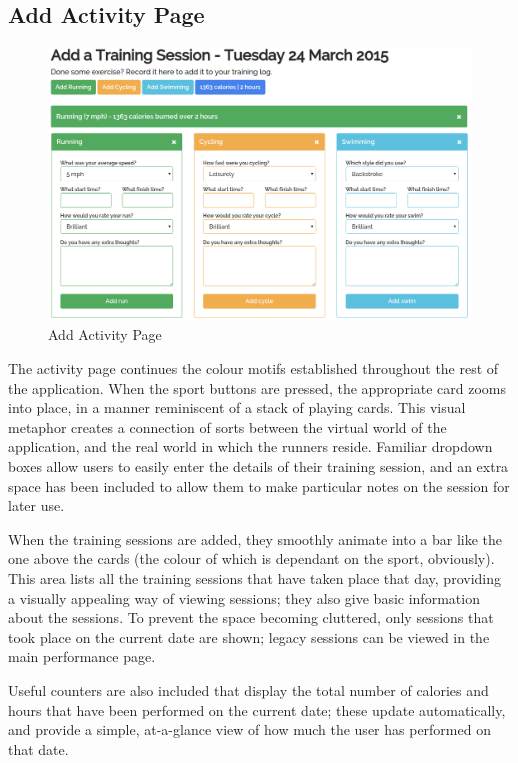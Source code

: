 \documentclass{article}[12pt,a4paper]
\begin{document}
\subsection{Add Activity Page}
\begin{figure}[h!]
  \includegraphics[scale=0.35]{final_ui/add_activity}
  \caption{Add Activity Page}
\end{figure}

The activity page continues the colour motifs established throughout the rest of the application. When the sport buttons are pressed, the appropriate card zooms into place, in a manner reminiscent of a stack of playing cards. This visual metaphor creates a connection of sorts between the virtual world of the application, and the real world in which the runners reside. Familiar dropdown boxes allow users to easily enter the details of their training session, and an extra space has been included to allow them to make particular notes on the session for later use. 

When the training sessions are added, they smoothly animate into a bar like the one above the cards (the colour of which is dependant on the sport, obviously). This area lists all the training sessions that have taken place that day, providing a visually appealing way of viewing sessions; they also give basic information about the sessions. To prevent the space becoming cluttered, only sessions that took place on the current date are shown; legacy sessions can be viewed in the main performance page.

Useful counters are also included that display the total number of calories and hours that have been performed on the current date; these update automatically, and provide a simple, at-a-glance view of how much the user has performed on that date.
\end{document}
